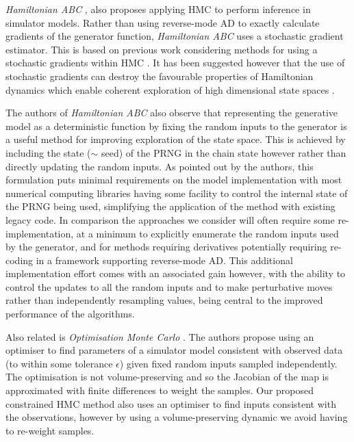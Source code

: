 \emph{Hamiltonian ABC} \cite{meeds2015hamiltonian}, also proposes applying \ac{HMC} to perform inference in simulator models. Rather than using reverse-mode \ac{AD} to exactly calculate gradients of the generator function, \emph{Hamiltonian ABC} uses a stochastic gradient estimator. This is based on previous work considering methods for using a stochastic gradients within \ac{HMC} \citep{welling2011bayesian,chen2014stochastic}. It has been suggested however that the use of stochastic gradients can destroy the favourable properties of Hamiltonian dynamics which enable coherent exploration of high dimensional state spaces \citep{betancourt2015fundamental}. 

The authors of \emph{Hamiltonian ABC} also observe that representing the generative model as a deterministic function by fixing the random inputs to the generator is a useful method for improving exploration of the state space. This is achieved by including the state ($\sim$ seed) of the \ac{PRNG} in the chain state however rather than directly updating the random inputs. As pointed out by the authors, this formulation puts minimal requirements on the model implementation with most numerical computing libraries having some facility to control the internal state of the \ac{PRNG} being used, simplifying the application of the method with existing legacy code. In comparison the approaches we consider will often require some re-implementation, at a minimum to explicitly enumerate the random inputs used by the generator, and for methods requiring derivatives potentially requiring re-coding in a framework supporting reverse-mode \ac{AD}. This additional implementation effort comes with an associated gain however, with the ability to control the updates to all the random inputs and to make perturbative moves rather than independently resampling values, being central to the improved performance of the algorithms. 

Also related is \emph{Optimisation Monte Carlo} \citep{meeds2015optimization}. The authors propose using an optimiser to find parameters of a simulator model consistent with observed data (to within some tolerance $\epsilon$) given fixed random inputs sampled independently. The optimisation is not volume-preserving and so the Jacobian of the map is approximated with finite differences to weight the samples. Our proposed constrained \ac{HMC} method also uses an optimiser to find inputs consistent with the observations, however by using a volume-preserving dynamic we avoid having to re-weight samples. %

